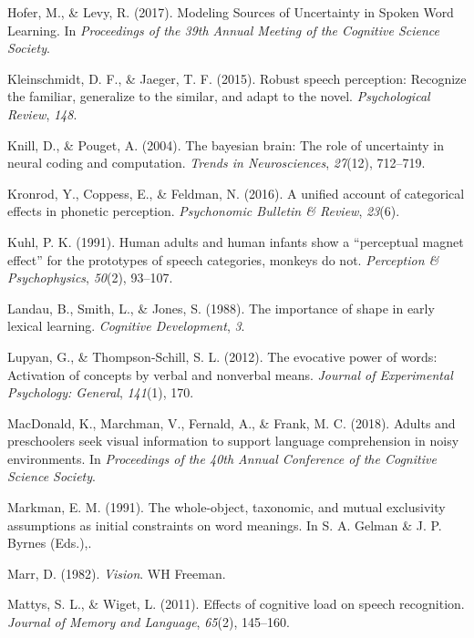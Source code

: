\documentclass[english,,man,floatsintext]{apa6}
\theoremstyle{definition}
\theoremstyle{definition}
\theoremstyle{definition}
\theoremstyle{remark}
\begin{document}
\hypertarget{ref-hofer2017}{}
Hofer, M., \& Levy, R. (2017). Modeling Sources of Uncertainty in Spoken
Word Learning. In \emph{Proceedings of the 39th Annual Meeting of the
Cognitive Science Society}.

\hypertarget{ref-kleinschmidt2015}{}
Kleinschmidt, D. F., \& Jaeger, T. F. (2015). Robust speech perception:
Recognize the familiar, generalize to the similar, and adapt to the
novel. \emph{Psychological Review}, \emph{148}.

\hypertarget{ref-Knill04}{}
Knill, D., \& Pouget, A. (2004). The bayesian brain: The role of
uncertainty in neural coding and computation. \emph{Trends in
Neurosciences}, \emph{27}(12), 712--719.

\hypertarget{ref-kronrod2016}{}
Kronrod, Y., Coppess, E., \& Feldman, N. (2016). A unified account of
categorical effects in phonetic perception. \emph{Psychonomic Bulletin
\& Review}, \emph{23}(6).

\hypertarget{ref-kuhl1991}{}
Kuhl, P. K. (1991). Human adults and human infants show a ``perceptual
magnet effect'' for the prototypes of speech categories, monkeys do not.
\emph{Perception \& Psychophysics}, \emph{50}(2), 93--107.

\hypertarget{ref-landau1988}{}
Landau, B., Smith, L., \& Jones, S. (1988). The importance of shape in
early lexical learning. \emph{Cognitive Development}, \emph{3}.

\hypertarget{ref-lupyan2012}{}
Lupyan, G., \& Thompson-Schill, S. L. (2012). The evocative power of
words: Activation of concepts by verbal and nonverbal means.
\emph{Journal of Experimental Psychology: General}, \emph{141}(1), 170.

\hypertarget{ref-macdonald2018}{}
MacDonald, K., Marchman, V., Fernald, A., \& Frank, M. C. (2018). Adults
and preschoolers seek visual information to support language
comprehension in noisy environments. In \emph{Proceedings of the 40th
Annual Conference of the Cognitive Science Society}.

\hypertarget{ref-markman1991}{}
Markman, E. M. (1991). The whole-object, taxonomic, and mutual
exclusivity assumptions as initial constraints on word meanings. In S.
A. Gelman \& J. P. Byrnes (Eds.),.

\hypertarget{ref-marr1982}{}
Marr, D. (1982). \emph{Vision}. WH Freeman.

\hypertarget{ref-mattys11}{}
Mattys, S. L., \& Wiget, L. (2011). Effects of cognitive load on speech
recognition. \emph{Journal of Memory and Language}, \emph{65}(2),
145--160.
\end{document}
